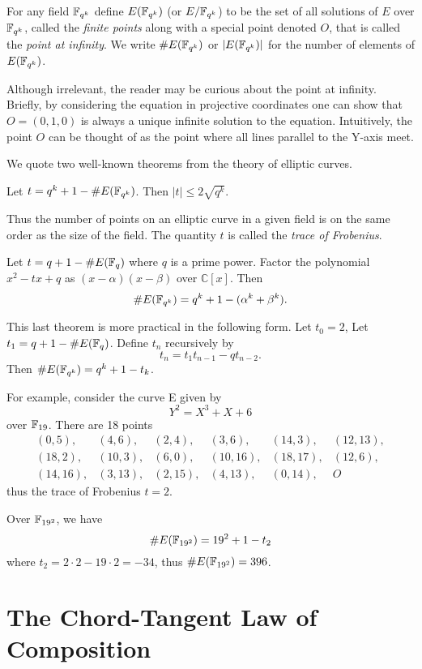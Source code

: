 For any field $\mathbb{F}_{q^k}$ define $E(\mathbb{F}_{q^k})$ (or $E/\mathbb{F}_{q^k}$)
to be the set of all solutions
of $E$ over $\mathbb{F}_{q^k}$, called the \emph{finite points}
along with a special point denoted $O$,
that is called the \emph{point at infinity}. We write $\#E(\mathbb{F}_{q^k})$ 
or $|E(\mathbb{F}_{q^k})|$ for
the number of elements of $E(\mathbb{F}_{q^k})$.

Although irrelevant, the reader may be curious about the point at infinity.
Briefly, by considering the equation in
projective coordinates one can show that $O = (0,1,0)$ is always a unique
infinite solution to the equation. Intuitively,
the point $O$ can be thought of as the point where all lines
parallel to the Y-axis meet.

We quote two well-known theorems from the theory of elliptic curves.

\begin{theorem}
[Hasse] Let $t = q^k + 1 - \#E(\mathbb{F}_{q^k})$.
Then $|t| \le 2\sqrt{q^k}$.
\end{theorem}

Thus the number of points on an elliptic curve in a given field
is on the same order as the size of the field.
The quantity $t$ is called the \emph{trace of Frobenius}.

\begin{theorem}
[Weil] Let $t = q + 1 - \#E(\mathbb{F}_q)$
where $q$ is a prime power.
Factor the polynomial $x^2 - t x + q$ as $(x-\alpha)(x-\beta)$ over
$\mathbb{C}[x]$.
Then
\[ \#E(\mathbb{F}_{q^k}) = q^k + 1 - (\alpha^k + \beta^k) .\]
\end{theorem}

This last theorem is more practical in the following form. Let $t_0 = 2$,
Let $t_1 = q + 1 - \#E(\mathbb{F}_q)$.
Define $t_n$ recursively by
\[ t_n = t_1 t_{n-1} - q t_{n-2} .\]
Then $\#E(\mathbb{F}_{q^k}) = q^k + 1 - t_k$.

For example, consider the curve E\cite{bk} given by
\[ Y^2 = X^3 + X + 6 \]
over $\mathbb{F}_{19}$. There are 18 points
\[
\begin{array}{llllll}
(0,5), & (4,6), & (2,4), & (3,6), & (14,3), & (12,13), \\
(18,2), & (10,3), & (6,0), & (10,16), & (18, 17), & (12,6), \\
(14,16), & (3,13), & (2,15), & (4,13), & (0,14), & O
\end{array}
\]
thus the trace of Frobenius $t = 2$.

Over $\mathbb{F}_{{19}^2}$, we have
\[
\#E(\mathbb{F}_{{19}^2}) = 19^2 + 1 - t_2
\]
where $t_2 = 2\cdot 2 - 19 \cdot 2 = -34$, thus
$\#E(\mathbb{F}_{{19}^2}) = 396$.

\section {The Chord-Tangent Law of Composition}

